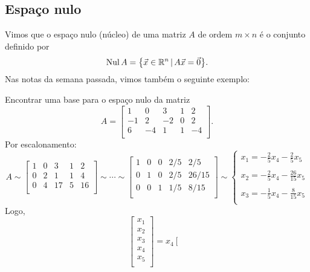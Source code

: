 \documentclass[../livro.tex]{subfiles}  %
\begin{document}
\subsection{Espaço nulo}

Vimos que o espaço nulo (núcleo) de uma matriz $A$ de ordem $m \times n$ é o conjunto definido por
\[
\operatorname{Nul} A = \big\{ \vec{x} \in \mathbb{R}^n \, | \, A\vec{x} = \vec{0}  \big\}.
\] Nas notas da semana passada, vimos também o seguinte exemplo:

\begin{example}
	Encontrar uma base para o espaço nulo da matriz
	\[
	A = \left[
	\begin{array}{ccccc}
	1  & 0  & 3   & 1 & 2 \\
	-1 & 2  & -2  & 0 & 2 \\
	6  & -4 & 1   & 1 & -4 \\
	\end{array}
	\right].
	\]
	Por escalonamento:
	\[
	A \sim \left[
	\begin{array}{ccccc}
	1  & 0  & 3   & 1 & 2  \\
	0  & 2  & 1   & 1 & 4  \\
	0  & 4  & 17  & 5 & 16 \\
	\end{array}
	\right] \sim \cdots \sim \left[
	\begin{array}{ccccc}
	1  & 0  & 0  & 2/5 & 2/5  \\
	0  & 1  & 0  & 2/5 & 26/15  \\
	0  & 0  & 1  & 1/5 & 8/15 \\
	\end{array}
	\right] \sim 
	\left\{
	\begin{array}{ll}
	x_1 = - \frac{2}{5} x_4 - \frac{2}{5} x_5  \\
	\\
	x_2 = - \frac{2}{5} x_4 - \frac{26}{15} x_5  \\
	\\
	x_3 = - \frac{1}{5} x_4 - \frac{8}{15} x_5  \\
	\end{array}
	\right.
	\] Logo,
	\[
	\left[
	\begin{array}{c}
	x_1 \\
	x_2 \\
	x_3 \\
	x_4 \\
	x_5 \\
	\end{array}
	\right] = 
	x_4 \left[
	\begin{array}{c}

\end{array}\]
\end{example}
\end{document}
